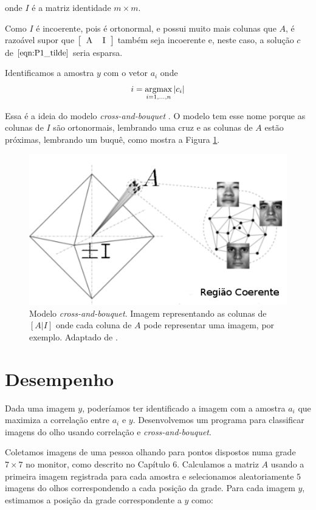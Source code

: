 onde $I$ é a matriz identidade $m \times m$.

Como $I$ é incoerente, pois é ortonormal, e possui muito mais colunas que $A$, é razoável supor que $\left[\begin{tabular}{c c} A &  I \end{tabular} \right]$ também seja incoerente e, neste caso, a solução $c$ de $\eqref{eqn:P1_tilde}$ seria esparsa.

Identificamos a amostra $y$ com o vetor $a_i$ onde
$$i = \argmax_{i = 1, \hdots, n} \vert c_i \vert$$

Essa é a ideia do modelo \textit{cross-and-bouquet} \cite{wrima}. O modelo tem esse nome porque as colunas de $I$ são ortonormais, lembrando uma cruz e as colunas de $A$ estão próximas, lembrando um buquê, como mostra a Figura \ref{fig:cross_bouquet}.

\begin{figure}
\centering
\includegraphics[scale=.6]{imagens/cross-and-bouquet.png}
\caption{Modelo \textit{cross-and-bouquet}. Imagem representando as colunas de $\left[ A \vert I \right]$ onde cada coluna de $A$ pode representar uma imagem, por exemplo. Adaptado de \cite{yangetal}.}
\label{fig:cross_bouquet}
\end{figure}

\section{Desempenho}

Dada uma imagem $y$, poderíamos ter identificado a imagem com a amostra $a_i$ que maximiza a correlação entre $a_i$ e $y$. Desenvolvemos um programa para classificar imagens do olho usando correlação e \textit{cross-and-bouquet}.

Coletamos imagens de uma pessoa olhando para pontos dispostos numa grade $7 \times 7$ no monitor, como descrito no Capítulo $6$.  Calculamos a matriz $A$ usando a primeira imagem registrada para cada amostra e selecionamos aleatoriamente $5$ imagens do olhos correspondendo a cada posição da grade. Para cada imagem $y$, estimamos a posição da grade correspondente a $y$ como:

